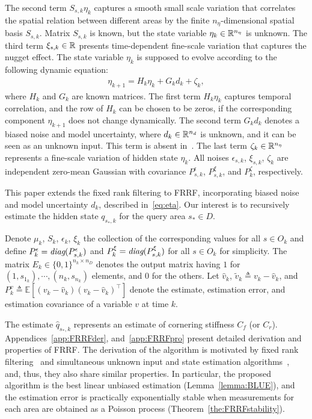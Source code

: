 \documentclass[letterpaper, 10 pt, conference]{ieeeconf}
\begin{document}
The second term $S_{s,k}\eta_k$ captures a smooth small scale variation that correlates the spatial relation between different areas by the finite $n_\eta$-dimensional spatial basis $S_{s,k}$.
Matrix $S_{s,k}$ is known, but the state variable $\eta_k \in \mathbb{R}^{n_\eta}$ is unknown. The third term $\xi_{s,k} \in \mathbb{R}$ presents time-dependent fine-scale variation that captures the nugget effect. The state variable $\eta_k$ is supposed to evolve according to the following dynamic equation:
\begin{align}
    \eta_{k+1} = H_k \eta_k + G_k d_k + \zeta_k,
    \label{eq:eta}
\end{align}
where $H_k$ and $G_k$ are known matrices.
The first term $H_k \eta_k$ captures temporal correlation, and the row of $H_k$ can be chosen to be zeros, if the corresponding component $\eta_{k+1}$ does not change dynamically. The second term $G_k d_k$ denotes a biased noise and model uncertainty, where $d_k \in \mathbb{R}^{n_d}$ is unknown, and it can be seen as an unknown input.
This term is absent in~\cite{cressie2010fixed,nguyen2014spatio}. The last term $\zeta_k \in \mathbb{R}^{n_\eta}$ represents a fine-scale variation of hidden state $\eta_k$.
All noises $\epsilon_{s,k}$, $\xi_{s,k}$, $\zeta_k$
are independent zero-mean Gaussian with covariance $P_{s,k}^\epsilon$, $P_{s,k}^\xi$, and $P_{k}^\zeta$, respectively.

This paper extends the fixed rank filtering to FRRF, incorporating biased noise and model uncertainty $d_k$, described in~\eqref{eq:eta}. Our interest is to recursively estimate the hidden state $q_{s_*,k}$ for the query area $s_* \in D$. 

Denote $\mu_k$, $S_k$, $\epsilon_k$, $\xi_k$  the collection of the corresponding values for all $s \in O_k$ and define $P_k^\epsilon = \operatorname*{\textit{diag}} (P_{s,k}^\epsilon)$ and $P_k^\xi = \operatorname*{\textit{diag}} (P_{s,k}^\xi)$ for all $s \in O_k$ for simplicity.
The matrix $E_k \in \{0,1\}^{n_k \times n_D}$ denotes the output matrix having $1$ for $(1,s_{1_k}), \cdots, (n_k,s_{n_k})$ elements, and $0$ for the others.
Let $\hat{v}_k$, $\tilde{v}_k \triangleq v_k-\hat{v}_k$, and $P_k^{v} \triangleq {\mathbb{E}}[(v_k-\hat{v}_k)(v_k-\hat{v}_k)^\top]$ denote the estimate, estimation error, and estimation covariance of a variable $v$ at time $k$.

The estimate $\hat{q}_{s_*,k}$ represents an estimate of cornering stiffness $C_f$ (or $C_r$). 
Appendices~\ref{app:FRRFder}, and~\ref{app:FRRFpro} present detailed derivation and properties of FRRF.
The derivation of the algorithm is motivated by fixed rank filtering~\cite{cressie2010fixed} and simultaneous unknown input and state estimation algorithms~\cite{gillijns2007unbiased,wan2019attack}, and, thus, they also share similar properties. 
In particular, the proposed algorithm is the best linear unbiased estimation (Lemma~\ref{lemma:BLUE}), and the estimation error is practically exponentially stable when measurements for each area are obtained as a Poisson process (Theorem~\ref{the:FRRFstability}).
\end{document}
